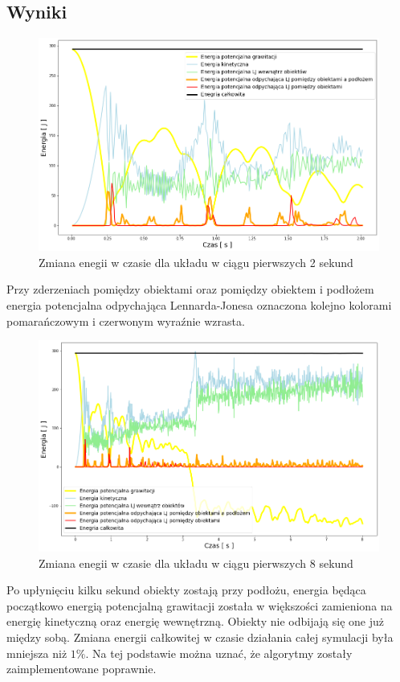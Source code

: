 \documentclass[12pt, letterpaper]{report}
\begin{document}
    \pagebreak
    \subsection{Wyniki}
    \begin{figure}[h]
        \centering
        \includegraphics[width=13cm]{energy_test_0to2s}
        \caption{Zmiana enegii w czasie dla układu w ciągu pierwszych 2 sekund}
    \end{figure}

    Przy zderzeniach pomiędzy obiektami oraz pomiędzy obiektem i podłożem energia potencjalna
    odpychająca Lennarda-Jonesa oznaczona kolejno kolorami pomarańczowym i czerwonym
    wyraźnie wzrasta.
    \begin{figure}[h]
        \centering
        \includegraphics[width=13cm]{energy_test_0to8s}
        \caption{Zmiana enegii w czasie dla układu w ciągu pierwszych 8 sekund}
    \end{figure}
    
    Po upłynięciu kilku sekund obiekty zostają przy podłożu, energia będąca początkowo energią
    potencjalną grawitacji została w większości zamieniona na energię kinetyczną oraz energię
    wewnętrzną. Obiekty nie odbijają się one już między sobą.
    Zmiana energii całkowitej w czasie działania całej symulacji była mniejsza niż $1\%$. Na tej
    podstawie można uznać, że algorytmy zostały zaimplementowane poprawnie.
\end{document}
